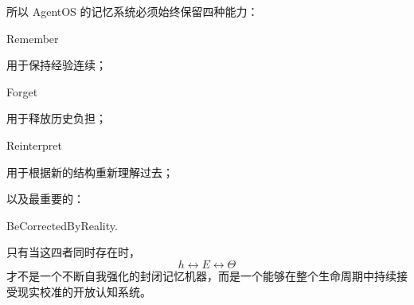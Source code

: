 所以 AgentOS 的记忆系统必须始终保留四种能力：

\begin{statementbox}
Remember
\end{statementbox}

用于保持经验连续；

\begin{statementbox}
Forget
\end{statementbox}

用于释放历史负担；

\begin{statementbox}
Reinterpret
\end{statementbox}

用于根据新的结构重新理解过去；

以及最重要的：

\begin{statementbox}
BeCorrectedByReality.
\end{statementbox}

只有当这四者同时存在时，
\[
h\leftrightarrow E\leftrightarrow\Theta
\]
才不是一个不断自我强化的封闭记忆机器，而是一个能够在整个生命周期中持续接受现实校准的开放认知系统。
